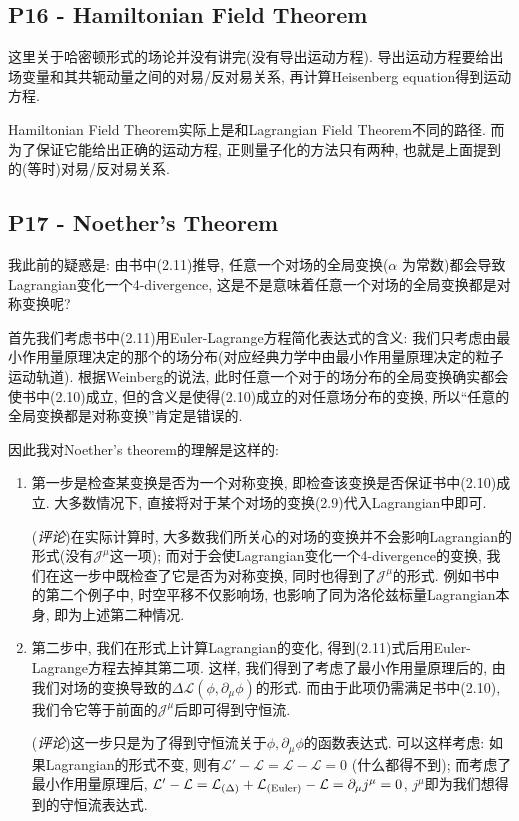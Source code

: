 \subsection{P16 - Hamiltonian Field Theorem}

这里关于哈密顿形式的场论并没有讲完(没有导出运动方程).
导出运动方程要给出场变量和其共轭动量之间的对易/反对易关系, 再计算Heisenberg equation得到运动方程.


Hamiltonian Field Theorem实际上是和Lagrangian Field Theorem不同的路径.
而为了保证它能给出正确的运动方程, 正则量子化的方法只有两种, 也就是上面提到的(等时)对易/反对易关系.

\subsection{P17 - Noether's Theorem}

我此前的疑惑是: 由书中(2.11)推导, 任意一个对场的全局变换($\alpha$ 为常数)都会导致Lagrangian变化一个4-divergence, 这是不是意味着任意一个对场的全局变换都是对称变换呢?

首先我们考虑书中(2.11)用Euler-Lagrange方程简化表达式的含义: 我们只考虑由最小作用量原理决定的那个的场分布(对应经典力学中由最小作用量原理决定的粒子运动轨道).
根据Weinberg的说法, 此时任意一个对于的场分布的全局变换确实都会使书中(2.10)成立, 但的含义是使得(2.10)成立的对任意场分布的变换, 所以“任意的全局变换都是对称变换”肯定是错误的.

因此我对Noether's theorem的理解是这样的:
\begin{enumerate}
  \item 第一步是检查某变换是否为一个对称变换, 即检查该变换是否保证书中(2.10)成立. 大多数情况下, 直接将对于某个对场的变换(2.9)代入Lagrangian中即可.

        (\textit{评论})在实际计算时, 大多数我们所关心的对场的变换并不会影响Lagrangian的形式(没有$\mathcal{J}^{\mu}$这一项); 而对于会使Lagrangian变化一个4-divergence的变换, 我们在这一步中既检查了它是否为对称变换, 同时也得到了$\mathcal{J}^{\mu}$的形式.
        例如书中的第二个例子中, 时空平移不仅影响场, 也影响了同为洛伦兹标量Lagrangian本身, 即为上述第二种情况.
  \item 第二步中, 我们在形式上计算Lagrangian的变化, 得到(2.11)式后用Euler-Lagrange方程去掉其第二项.
        这样, 我们得到了考虑了最小作用量原理后的, 由我们对场的变换导致的$\Delta \mathcal{L}(\phi, \partial_\mu \phi)$的形式.
        而由于此项仍需满足书中(2.10), 我们令它等于前面的$\mathcal{J}^{\mu}$后即可得到守恒流.

        (\textit{评论})这一步只是为了得到守恒流关于$\phi, \partial_\mu \phi$的函数表达式. 可以这样考虑: 如果Lagrangian的形式不变, 则有$\mathcal{L}'-\mathcal{L}=\mathcal{L}-\mathcal{L}=0$ (什么都得不到); 而考虑了最小作用量原理后, $\mathcal{L}'-\mathcal{L}=\mathcal{L}_{(\Delta)}+\mathcal{L}_{(\rm Euler)}-\mathcal{L}=\partial_{\mu}j^{\mu}=0$, $j^{\mu}$即为我们想得到的守恒流表达式.
\end{enumerate}

